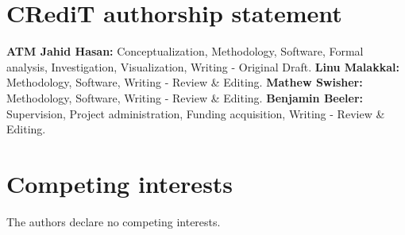 \documentclass[review]{elsarticle}
\begin{document}
\section{CRediT authorship statement}

\textbf{ATM Jahid Hasan:} Conceptualization, Methodology, Software,
Formal analysis, Investigation, Visualization, Writing - Original Draft.
\textbf{Linu Malakkal:} Methodology, Software, Writing - Review \& Editing.
\textbf{Mathew Swisher:} Methodology, Software, Writing - Review \& Editing.
\textbf{Benjamin Beeler:} Supervision, Project administration,
Funding acquisition, Writing - Review \& Editing.


\section{Competing interests}

The authors declare no competing interests.




\end{document}
